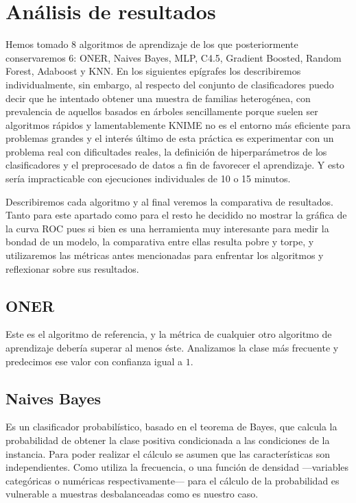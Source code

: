\documentclass{article}
\newcommand{\img}[2]{
\noindent\makebox[\textwidth][c]{\texttt{[image: \#1]}}%
}
\begin{document}
\section{Análisis de resultados}

Hemos tomado 8 algoritmos de aprendizaje de los que posteriormente conservaremos 6: ONER, Naives Bayes, MLP, C4.5, Gradient Boosted, Random Forest, Adaboost y KNN. En los siguientes epígrafes los describiremos individualmente, sin embargo, al respecto del conjunto de clasificadores puedo decir que he intentado obtener una muestra de familias heterogénea, con prevalencia de aquellos basados en árboles sencillamente porque suelen ser algoritmos rápidos y lamentablemente KNIME no es el entorno más eficiente para problemas grandes y el interés último de esta práctica es experimentar con un problema real con dificultades reales, la definición de hiperparámetros de los clasificadores y el preprocesado de datos a fin de favorecer el aprendizaje. Y esto sería impracticable con ejecuciones individuales de 10 o 15 minutos.

Describiremos cada algoritmo y al final veremos la comparativa de resultados. Tanto para este apartado como para el resto he decidido no mostrar la gráfica de la curva ROC pues si bien es una herramienta muy interesante para medir la bondad de un modelo, la comparativa entre ellas resulta pobre y torpe, y utilizaremos las métricas antes mencionadas para enfrentar los algoritmos y reflexionar sobre sus resultados.

\subsection{ONER}

Este es el algoritmo de referencia, y la métrica de cualquier otro algoritmo de aprendizaje debería superar al menos éste. Analizamos la clase más frecuente y predecimos ese valor con confianza igual a $1$.

\img{oner}{1.0}

\subsection{Naives Bayes}

Es un clasificador probabilístico, basado en el teorema de Bayes, que calcula la probabilidad de obtener la clase positiva condicionada a las condiciones de la instancia. Para poder realizar el cálculo se asumen que las características son independientes. Como utiliza la frecuencia, o una función de densidad ---variables categóricas o numéricas respectivamente--- para el cálculo de la probabilidad es vulnerable a muestras desbalanceadas como es nuestro caso. 
\end{document}
